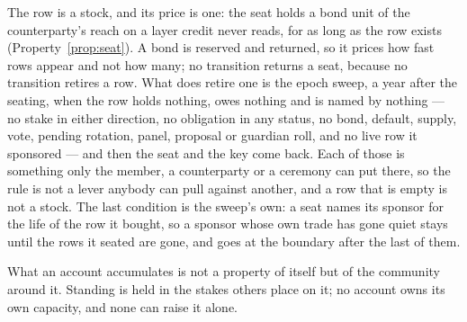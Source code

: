 The row is a stock, and its price is one: the seat holds a bond unit of the counterparty's
reach on a layer credit never reads, for as long as the row exists
(Property~\ref{prop:seat}). A bond is reserved and returned, so it prices how fast rows
appear and not how many; no transition returns a seat, because no transition retires a
row. What does retire one is the epoch sweep, a year after the seating, when the row holds
nothing, owes nothing and is named by nothing --- no stake in either direction, no
obligation in any status, no bond, default, supply, vote, pending rotation, panel,
proposal or guardian roll, and no live row it sponsored --- and then the seat and the key
come back. Each of those is something only the member, a counterparty or a ceremony can
put there, so the rule is not a lever anybody can pull against another, and a row that is
empty is not a stock. The last condition is the sweep's own: a seat names its sponsor for
the life of the row it bought, so a sponsor whose own trade has gone quiet stays until the
rows it seated are gone, and goes at the boundary after the last of them.

What an account accumulates is not a property of itself but of the community around it.
Standing is held in the stakes others place on it; no account owns its own capacity, and
none can raise it alone.
